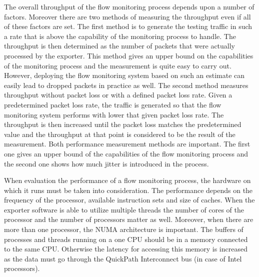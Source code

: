 The overall throughput of the flow monitoring process depends upon a number of factors. Moreover there are two methods of measuring the throughput even if all of these factors are set. The first method is to generate the testing traffic in such a rate that is above the capability of the monitoring process to handle. The throughput is then determined as the number of packets that were actually processed by the exporter. This method gives an upper bound on the capabilities of the monitoring process and the measurement is quite easy to carry out. However, deploying the flow monitoring system based on such an estimate can easily lead to dropped packets in practice as well. The second method measures throughput without packet loss or with a defined packet loss rate. Given a predetermined packet loss rate, the traffic is generated so that the flow monitoring system performs with lower that given packet loss rate. The throughput is then increased until the packet loss matches the predetermined value and the throughput at that point is considered to be the result of the measurement. Both performance measurement methods are important. The first one gives an upper bound of the capabilities of the flow monitoring process and the second one shows how much jitter is introduced in the process.

When evaluation the performance of a flow monitoring process, the hardware on which it runs must be taken into consideration. The performance depends on the frequency of the processor, available instruction sets and size of caches. When the exporter software is able to utilize multiple threads the number of cores of the processor and the number of processors matter as well. Moreover, when there are more than one processor, the NUMA architecture is important. The buffers of processes and threads running on a one CPU should be in a memory connected to the same CPU. Otherwise the latency for accessing this memory is increased as the data must go through the QuickPath Interconnect bus (in case of Intel processors). 







